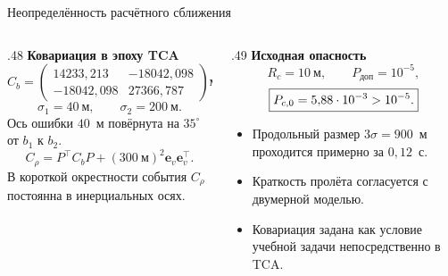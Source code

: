 \documentclass[11pt,aspectratio=169,t]{beamer}
\newcommand{\eqcompact}{\fontsize{10}{12}\selectfont}
\newcommand{\derivationmathspacing}{%
  \setlength{\abovedisplayskip}{2pt}%
  \setlength{\belowdisplayskip}{3pt}%
  \setlength{\abovedisplayshortskip}{2pt}%
  \setlength{\belowdisplayshortskip}{2pt}%
  \setlength{\jot}{2pt}}
\newcommand{\vect}[1]{\boldsymbol{#1}}
\begin{document}
\begin{frame}{Неопределённость расчётного сближения}
\relax\derivationmathspacing
\begin{columns}[T,onlytextwidth]
\begin{column}{.48\textwidth}
\textbf{Ковариация в эпоху TCA}
{\eqcompact\derivationmathspacing
\[
 C_b=\begin{pmatrix}
 14233{,}213&-18042{,}098\\
 -18042{,}098&27366{,}787
 \end{pmatrix}\text{м}^2.
\]
\[
 \sigma_1=40\ \text{м},\qquad \sigma_2=200\ \text{м}.
\]
}
Ось ошибки $40$~м повёрнута на $35^\circ$ от $b_1$ к $b_2$.
{\eqcompact\derivationmathspacing
\[
 C_\rho=P^\top C_bP+(300\ \text{м})^2\vect e_v\vect e_v^\top.
\]
}
В короткой окрестности события $C_\rho$ постоянна в инерциальных осях.
\end{column}
\begin{column}{.49\textwidth}
\textbf{Исходная опасность}
\[
 R_c=10\ \text{м},\qquad P_{\text{доп}}=10^{-5},
\]
\[
 \boxed{P_{c,0}=5{,}88\cdot10^{-3}>10^{-5}.}
\]
\begin{itemize}
\setlength{\itemsep}{4pt}
\item Продольный размер $3\sigma=900$~м проходится примерно за $0{,}12$~с.
\item Краткость пролёта согласуется с двумерной моделью.
\item Ковариация задана как условие учебной задачи непосредственно в TCA.
\end{itemize}
\end{column}
\end{columns}
\end{frame}
\end{document}
